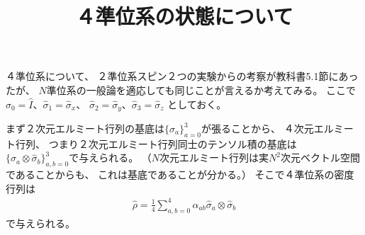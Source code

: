 \documentclass[a4paper, 10pt]{jsarticle}
\title{４準位系の状態について}
\author{}
\begin{document}
\maketitle

４準位系について、
２準位系スピン２つの実験からの考察が教科書5.1節にあったが、
$N$準位系の一般論を適応しても同じことが言えるか考えてみる。
ここで$\hat{\sigma}_0 = \hat{I}$、$\hat{\sigma}_1 = \hat{\sigma}_x$、
$\hat{\sigma}_2 = \hat{\sigma}_y$、$\hat{\sigma}_3 = \hat{\sigma}_z$
としておく。

まず２次元エルミート行列の基底は$\{\hat{\sigma}_a\}_{a=0}^3$が張ることから、
４次元エルミート行列、
つまり２次元エルミート行列同士のテンソル積の基底は
$\{ \hat{\sigma}_a \otimes \hat{\sigma}_b \}_{a,b = 0}^3$で与えられる。
（$N$次元エルミート行列は実$N^2$次元ベクトル空間であることからも、
これは基底であることが分かる。）
そこで４準位系の密度行列は
\begin{align}
	\hat{\rho} = \frac{1}{4}
	\sum_{a,b = 0}^4 \alpha_{ab} \hat{\sigma}_a \otimes \hat{\sigma}_b
\end{align}
で与えられる。
\end{document}
